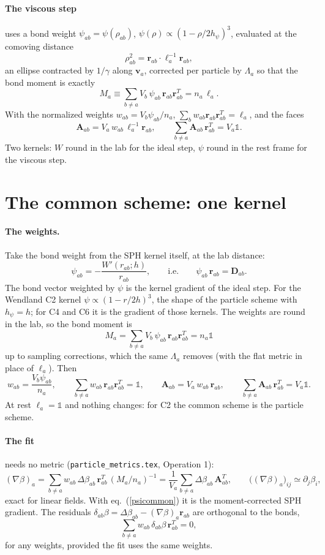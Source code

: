 \documentclass[11pt,aps,preprint,nofootinbib,superscriptaddress,tightenlines]{revtex4-2}
\newcommand{\one}{\mathds{1}}
\def\st{\begin{equation}}
\def\stp{\end{equation}}
\def\Eq#1{eq.~(\ref{#1})}
\let\oldparagraph\paragraph
\renewcommand{\paragraph}{\par\bigskip\oldparagraph}
\begin{document}
\paragraph{The viscous step} uses a bond weight $\psi_{ab}=\psi(\rho_{ab})$, $\psi(\rho)\propto(1-\rho/2h_\psi)^3$, evaluated at the
comoving distance
\st
\rho_{ab}^2=\bm r_{ab}\cdot\ell_a^{-1}\bm r_{ab} ,
\stp
an ellipse contracted by $1/\gamma$ along $\bm v_a$, corrected per particle by $\Lambda_a$ so that the bond moment is
exactly
\st
M_a\equiv\sum_{b\neq a}V_b\,\psi_{ab}\,\bm r_{ab}\bm r_{ab}^T=n_a\,\ell_a .
\label{Mold}
\stp
With the normalized weights $w_{ab}=V_b\psi_{ab}/n_a$, $\sum_bw_{ab}\bm r_{ab}\bm r_{ab}^T=\ell_a$, and the faces
\st
\bm A_{ab}=V_a\,w_{ab}\,\ell_a^{-1}\bm r_{ab},\qquad \sum_{b\neq a}\bm A_{ab}\,\bm r_{ab}^T=V_a\one .
\label{Aold}
\stp
Two kernels: $W$ round in the lab for the ideal step, $\psi$ round in the rest frame for the viscous step.

\section{The common scheme: one kernel}
\label{sec:common}

\paragraph{The weights.}  Take the bond weight from the SPH kernel itself, at the lab distance:
\st
\psi_{ab}=-\frac{W'(r_{ab};h)}{r_{ab}},\qquad\text{i.e.}\qquad \psi_{ab}\,\bm r_{ab}=\bm D_{ab}.
\label{psicommon}
\stp
The bond vector weighted by $\psi$ is the kernel gradient of the ideal step.  For the Wendland C2 kernel
$\psi\propto(1-r/2h)^3$, the shape of the particle scheme with $h_\psi=h$; for C4 and C6 it is the gradient of those kernels.
The weights are round in the lab, so the bond moment is
\st
M_a=\sum_{b\neq a}V_b\,\psi_{ab}\,\bm r_{ab}\bm r_{ab}^T=n_a\one
\label{Mnew}
\stp
up to sampling corrections, which the same $\Lambda_a$ removes (with the flat metric in place of $\ell_a$).
Then
\st
w_{ab}=\frac{V_b\psi_{ab}}{n_a},\qquad \sum_{b\neq a}w_{ab}\,\bm r_{ab}\bm r_{ab}^T=\one,\qquad
\bm A_{ab}=V_a\,w_{ab}\,\bm r_{ab},\qquad \sum_{b\neq a}\bm A_{ab}\,\bm r_{ab}^T=V_a\one .
\label{wnew}
\stp
At rest $\ell_a=\one$ and nothing changes: for C2 the common scheme is the particle scheme.

\paragraph{The fit} needs no metric (\texttt{particle\_metrics.tex}, Operation 1):
\st
(\nabla\beta)_a=\sum_{b\neq a}w_{ab}\,\Delta\beta_{ab}\,\bm r_{ab}^T\,(M_a/n_a)^{-1}=\frac1{V_a}\sum_{b\neq a}\Delta\beta_{ab}\,\bm A_{ab}^T ,
\qquad \big((\nabla\beta)_a\big)_{ij}\simeq\partial_j\beta_i ,
\label{fit}
\stp
exact for linear fields.  With \Eq{psicommon} it is the moment-corrected SPH gradient.  The residuals
$\delta_{ab}\beta=\Delta\beta_{ab}-(\nabla\beta)_a\bm r_{ab}$ are orthogonal to the bonds,
\st
\sum_{b\neq a}w_{ab}\,\delta_{ab}\beta\,\bm r_{ab}^T=0,
\label{orthog}
\stp
for any weights, provided the fit uses the same weights.
\end{document}
